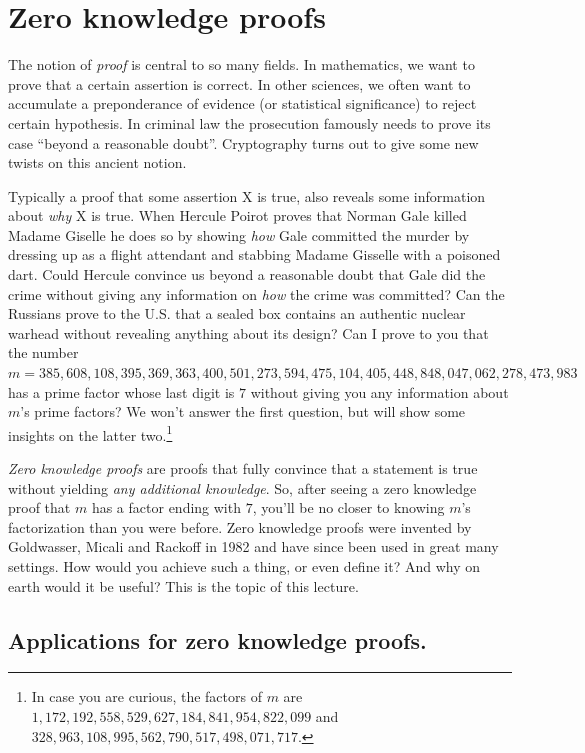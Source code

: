 \chapter{Zero knowledge proofs}\label{Zero-knowledge-proofs}

The notion of \emph{proof} is central to so many fields. In mathematics,
we want to prove that a certain assertion is correct. In other sciences,
we often want to accumulate a preponderance of evidence (or statistical
significance) to reject certain hypothesis. In criminal law the
prosecution famously needs to prove its case ``beyond a reasonable
doubt''. Cryptography turns out to give some new twists on this ancient
notion.

Typically a proof that some assertion X is true, also reveals some
information about \emph{why} X is true. When Hercule Poirot proves that
Norman Gale killed Madame Giselle he does so by showing \emph{how} Gale
committed the murder by dressing up as a flight attendant and stabbing
Madame Gisselle with a poisoned dart. Could Hercule convince us beyond a
reasonable doubt that Gale did the crime without giving any information
on \emph{how} the crime was committed? Can the Russians prove to the
U.S. that a sealed box contains an authentic nuclear warhead without
revealing anything about its design? Can I prove to you that the number
\(m=385,608,108,395,369,363,400,501,273,594,475,104,405,448,848,047,062,278,473,983\)
has a prime factor whose last digit is \(7\) without giving you any
information about \(m\)'s prime factors? We won't answer the first
question, but will show some insights on the latter two.\footnote{In
  case you are curious, the factors of \(m\) are
  \(1,172,192,558,529,627,184,841,954,822,099\) and
  \(328,963,108,995,562,790,517,498,071,717\).}

\emph{Zero knowledge proofs} are proofs that fully convince that a
statement is true without yielding \emph{any additional knowledge}. So,
after seeing a zero knowledge proof that \(m\) has a factor ending with
\(7\), you'll be no closer to knowing \(m\)'s factorization than you
were before. Zero knowledge proofs were invented by Goldwasser, Micali
and Rackoff in 1982 and have since been used in great many settings. How
would you achieve such a thing, or even define it? And why on earth
would it be useful? This is the topic of this lecture.

\section{Applications for zero knowledge
proofs.}\label{Applications-for-zero-kno}


